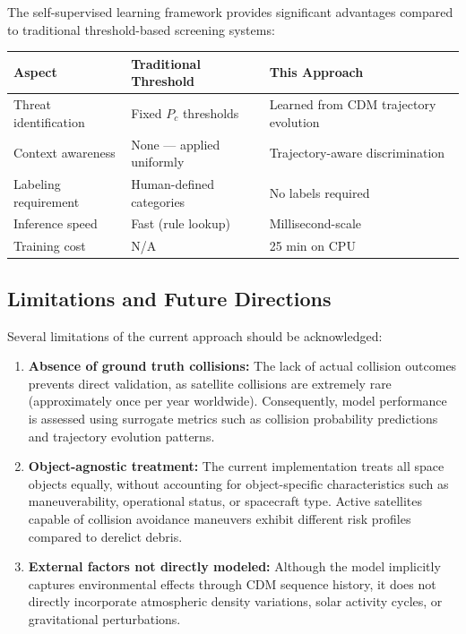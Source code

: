 \documentclass[12pt, a4paper]{article}
\begin{document}
The self-supervised learning framework provides significant advantages compared to traditional threshold-based screening systems:

\begin{center}
\begin{tabular}{lll}
\toprule
\textbf{Aspect} & \textbf{Traditional Threshold} & \textbf{This Approach} \\
\midrule
Threat identification & Fixed $P_c$ thresholds & Learned from CDM trajectory evolution \\
Context awareness     & None — applied uniformly & Trajectory-aware discrimination \\
Labeling requirement  & Human-defined categories & No labels required \\
Inference speed       & Fast (rule lookup) & Millisecond-scale \\
Training cost         & N/A & 25 min on CPU \\
\bottomrule
\end{tabular}
\end{center}

\subsection{Limitations and Future Directions}

Several limitations of the current approach should be acknowledged:

\begin{enumerate}
    \item \textbf{Absence of ground truth collisions:} The lack of actual collision outcomes prevents direct validation, as satellite collisions are extremely rare (approximately once per year worldwide). Consequently, model performance is assessed using surrogate metrics such as collision probability predictions and trajectory evolution patterns.

    \item \textbf{Object-agnostic treatment:} The current implementation treats all space objects equally, without accounting for object-specific characteristics such as maneuverability, operational status, or spacecraft type. Active satellites capable of collision avoidance maneuvers exhibit different risk profiles compared to derelict debris.

    \item \textbf{External factors not directly modeled:} Although the model implicitly captures environmental effects through CDM sequence history, it does not directly incorporate atmospheric density variations, solar activity cycles, or gravitational perturbations.
\end{enumerate}
\end{document}
